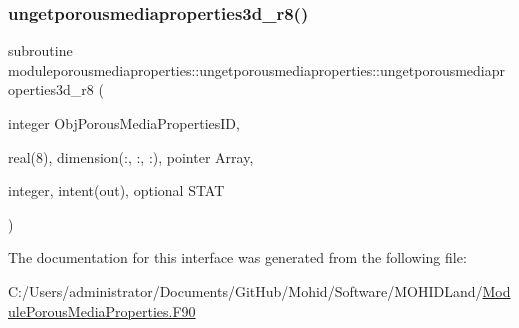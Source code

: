\mbox{\label{interfacemoduleporousmediaproperties_1_1ungetporousmediaproperties_a422eb3439560900e49cdfb513c6543a3}} 
\subsubsection{\texorpdfstring{ungetporousmediaproperties3d\+\_\+r8()}{ungetporousmediaproperties3d\_r8()}}
{\footnotesize\ttfamily subroutine moduleporousmediaproperties\+::ungetporousmediaproperties\+::ungetporousmediaproperties3d\+\_\+r8 (\begin{DoxyParamCaption}\item[{integer}]{Obj\+Porous\+Media\+Properties\+ID,  }\item[{real(8), dimension(\+:, \+:, \+:), pointer}]{Array,  }\item[{integer, intent(out), optional}]{S\+T\+AT }\end{DoxyParamCaption})\hspace{0.3cm}{\ttfamily [private]}}



The documentation for this interface was generated from the following file\+:\begin{DoxyCompactItemize}
\item 
C\+:/\+Users/administrator/\+Documents/\+Git\+Hub/\+Mohid/\+Software/\+M\+O\+H\+I\+D\+Land/\mbox{\hyperlink{_module_porous_media_properties_8_f90}{Module\+Porous\+Media\+Properties.\+F90}}\end{DoxyCompactItemize}
